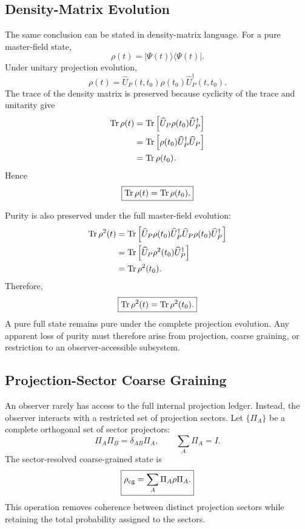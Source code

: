 \documentclass[11pt]{article}
\begin{document}
\subsection{Density-Matrix Evolution}

The same conclusion can be stated in density-matrix language. For a pure
master-field state,
\begin{equation}
\boxed{
\rho(t)
=
|\Psi(t)\rangle\langle\Psi(t)|.
}
\end{equation}
Under unitary projection evolution,
\begin{equation}
\boxed{
\rho(t)
=
\widehat U_P(t,t_0)
\rho(t_0)
\widehat U_P^\dagger(t,t_0).
}
\end{equation}
The trace of the density matrix is preserved because cyclicity of the trace and
unitarity give
\begin{align}
{\rm Tr}\,\rho(t)
&=
{\rm Tr}
\left[
\widehat U_P\rho(t_0)\widehat U_P^\dagger
\right]
\\
&=
{\rm Tr}
\left[
\rho(t_0)\widehat U_P^\dagger\widehat U_P
\right]
\\
&=
{\rm Tr}\,\rho(t_0).
\end{align}
Hence
\begin{equation}
\boxed{
{\rm Tr}\,\rho(t)
=
{\rm Tr}\,\rho(t_0).
}
\end{equation}

Purity is also preserved under the full master-field evolution:
\begin{align}
{\rm Tr}\,\rho^2(t)
&=
{\rm Tr}
\left[
\widehat U_P\rho(t_0)\widehat U_P^\dagger
\widehat U_P\rho(t_0)\widehat U_P^\dagger
\right]
\\
&=
{\rm Tr}
\left[
\widehat U_P\rho^2(t_0)\widehat U_P^\dagger
\right]
\\
&=
{\rm Tr}\,\rho^2(t_0).
\end{align}
Therefore,
\begin{equation}
\boxed{
{\rm Tr}\,\rho^2(t)
=
{\rm Tr}\,\rho^2(t_0).
}
\end{equation}
A pure full state remains pure under the complete projection evolution. Any
apparent loss of purity must therefore arise from projection, coarse graining, or
restriction to an observer-accessible subsystem.

\subsection{Projection-Sector Coarse Graining}

An observer rarely has access to the full internal projection ledger. Instead,
the observer interacts with a restricted set of projection sectors. Let
\(\{\Pi_A\}\) be a complete orthogonal set of sector projectors:
\begin{equation}
\boxed{
\Pi_A\Pi_B
=
\delta_{AB}\Pi_A,
\qquad
\sum_A\Pi_A=I.
}
\end{equation}
The sector-resolved coarse-grained state is
\begin{equation}
\boxed{
\rho_{\rm cg}
=
\sum_A
\Pi_A\rho\Pi_A.
}
\end{equation}
This operation removes coherence between distinct projection sectors while
retaining the total probability assigned to the sectors.
\end{document}
